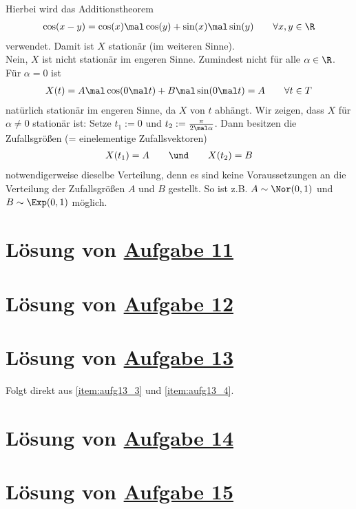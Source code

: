 Hierbei wird das Additionstheorem
\begin{align}\label{eq:Aufg10Additionstheorem}
	\cos(x-y)=\cos(x)\mal\cos(y)+\sin(x)\mal\sin(y)\qquad\forall x,y\in\R
\end{align}
verwendet.
Damit ist $X$ stationär (im weiteren Sinne).\nl
{}\\
Nein, $X$ ist nicht stationär im engeren Sinne. 
Zumindest nicht für alle $\alpha\in\R$.
Für $\alpha=0$ ist 
\begin{align*}
	X(t)=A\mal\cos(0\mal t)+B\mal\sin(0\mal t)=A\qquad\forall t\in T
\end{align*}
natürlich stationär im engeren Sinne, da $X$  von $t$ abhängt.
Wir zeigen, dass $X$ für $\alpha\neq0$  stationär ist:
Setze $t_1:=0$ und $t_2:=\frac{\pi}{2\mal\alpha}$.
Dann besitzen die Zufallsgrößen (= einelementige Zufallsvektoren)
\begin{align*}
	X(t_1)=A\qquad\und\qquad X(t_2)=B
\end{align*}
 notwendigerweise dieselbe Verteilung, denn es sind keine Voraussetzungen an die Verteilung der Zufallsgrößen $A$ und $B$ gestellt.
So ist z.B. $A\sim\Nor(0,1)$ und $B\sim\Exp(0,1)$ möglich.

\section{Lösung von 
	\texorpdfstring{\hyperref[aufg:11]{Aufgabe 11}}{}
}\label{loes:11}


\section{Lösung von 
	\texorpdfstring{\hyperref[aufg:12]{Aufgabe 12}}{}
}\label{loes:12}

\section{Lösung von 
	\texorpdfstring{\hyperref[aufg:13]{Aufgabe 13}}{}
}\label{loes:13}





Folgt direkt aus \ref{item:aufg13_3} und \ref{item:aufg13_4}.

\section{Lösung von 
	\texorpdfstring{\hyperref[aufg:14]{Aufgabe 14}}{}
}\label{loes:14}

\section{Lösung von 
	\texorpdfstring{\hyperref[aufg:15]{Aufgabe 15}}{}
}\label{loes:15}

